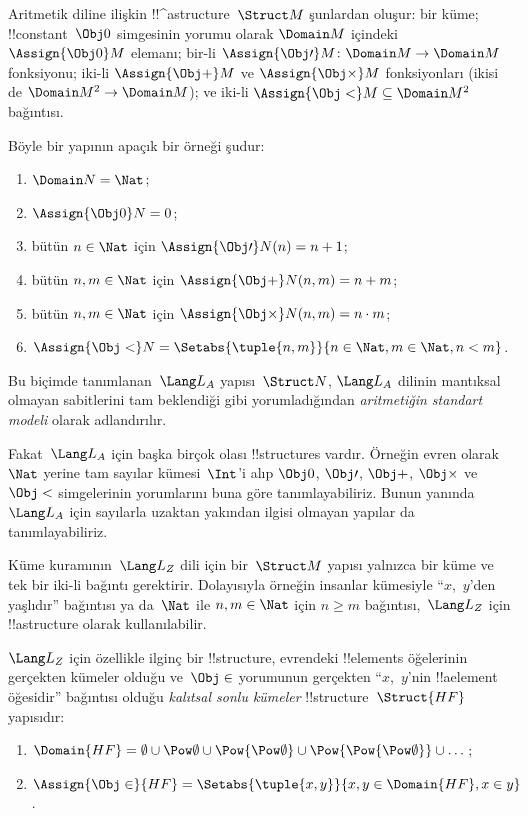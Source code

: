 \begin{ex}
Aritmetik diline ilişkin !!^a{structure}~$\Struct M$ şunlardan oluşur:
bir küme; !!{constant}~$\Obj0$ simgesinin yorumu olarak
$\Domain M$ içindeki $\Assign{\Obj0}M$ elemanı; bir-li
$\Assign{\Obj\prime}M\colon\Domain M\to\Domain M$ fonksiyonu;
iki-li $\Assign{\Obj+}M$ ve $\Assign{\Obj\times}M$ fonksiyonları
(ikisi de $\Domain M^2\to\Domain M$); ve iki-li
$\Assign{\Obj<}M\subseteq\Domain M^2$ bağıntısı.

Böyle bir yapının apaçık bir örneği şudur:
\begin{enumerate}
\item $\Domain N=\Nat$;
\item $\Assign{\Obj0}N=0$;
\item bütün $n\in\Nat$ için $\Assign{\Obj\prime}N(n)=n+1$;
\item bütün $n,m\in\Nat$ için $\Assign{\Obj+}N(n,m)=n+m$;
\item bütün $n,m\in\Nat$ için $\Assign{\Obj\times}N(n,m)=n\cdot m$;
\item $\Assign{\Obj<}N=\Setabs{\tuple{n,m}}{n\in\Nat,m\in\Nat,n<m}$.
\end{enumerate}
Bu biçimde tanımlanan~$\Lang L_A$ yapısı~$\Struct N$,
$\Lang L_A$ dilinin mantıksal olmayan sabitlerini tam beklendiği gibi
yorumladığından \emph{aritmetiğin standart modeli} olarak adlandırılır.

Fakat~$\Lang L_A$ için başka birçok olası !!{structure}s vardır.
Örneğin evren olarak~$\Nat$ yerine tam sayılar kümesi~$\Int$'i alıp
$\Obj0$, $\Obj\prime$, $\Obj+$, $\Obj\times$ ve $\Obj<$ simgelerinin
yorumlarını buna göre tanımlayabiliriz. Bunun yanında~$\Lang L_A$ için
sayılarla uzaktan yakından ilgisi olmayan yapılar da tanımlayabiliriz.
\end{ex}

\begin{ex}
Küme kuramının~$\Lang L_Z$ dili için bir~$\Struct M$ yapısı yalnızca
bir küme ve tek bir iki-li bağıntı gerektirir. Dolayısıyla örneğin
insanlar kümesiyle ``$x$,~$y$'den yaşlıdır'' bağıntısı ya da~$\Nat$
ile $n,m\in\Nat$ için $n\geq m$ bağıntısı,~$\Lang L_Z$ için
!!a{structure} olarak kullanılabilir.

$\Lang L_Z$ için özellikle ilginç bir !!{structure}, evrendeki
!!{element}s öğelerinin gerçekten kümeler olduğu ve~$\Obj\in$
yorumunun gerçekten ``$x$,~$y$'nin !!a{element} öğesidir'' bağıntısı
olduğu \emph{kalıtsal sonlu kümeler} !!{structure}~$\Struct{{HF}}$
yapısıdır:
\begin{enumerate}
\item $\Domain{{HF}}=\emptyset\cup\Pow\emptyset\cup
  \Pow{\Pow\emptyset}\cup\Pow{\Pow{\Pow\emptyset}}\cup\dots$;
\item $\Assign{\Obj\in}{{HF}}=
  \Setabs{\tuple{x,y}}{x,y\in\Domain{{HF}},x\in y}$.
\end{enumerate}
\end{ex}

